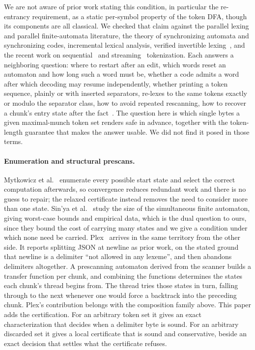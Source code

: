 \documentclass[11pt,a4paper]{article}
\theoremstyle{definition}
\theoremstyle{plain}
\begin{document}
We are not aware of prior work stating this condition, in particular the re-entrancy requirement, as a static per-symbol
property of the token DFA, though its components are all classical. We checked that claim against the parallel lexing
and parallel finite-automata literature, the theory of synchronizing automata and synchronizing codes, incremental
lexical analysis, verified invertible lexing~\cite{chassot2026ziplex}, and the recent work on
sequential~\cite{reps1998maximal,li2025uniform} and streaming~\cite{li2026streaming} tokenization. Each answers a
neighboring question: where to restart after an edit, which words reset an automaton and how long such a word must be,
whether a code admits a word after which decoding may resume independently, whether printing a token sequence, plainly
or with inserted separators, re-lexes to the same tokens exactly or modulo the separator class, how to avoid repeated
rescanning, how to recover a chunk's entry state after the fact~\cite{voetter2021gpu}. The question here is which single
bytes a given maximal-munch token set renders safe in advance, together with the token-length guarantee that makes the
answer usable. We did not find it posed in those terms.

\paragraph{Enumeration and structural prescans.} Mytkowicz et al.~\cite{mytkowicz2014dpfsm} enumerate every possible
start state and select the correct computation afterwards, so convergence reduces redundant work and there is no guess
to repair; the relaxed certificate instead removes the need to consider more than one state. Sin'ya et
al.~\cite{sinya2013sfa} study the size of the simultaneous finite automaton, giving worst-case bounds and empirical
data, which is the dual question to ours, since they bound the cost of carrying many states and we give a condition
under which none need be carried. Plex~\cite{li2021plex} arrives in the same territory from the other side. It reports
splitting JSON at newline as prior work, on the stated ground that newline is a delimiter ``not allowed in any lexeme'',
and then abandons delimiters altogether. A prescanning automaton derived from the scanner builds a transfer function per
chunk, and combining the functions determines the states each chunk's thread begins from. The thread tries those states
in turn, falling through to the next whenever one would force a backtrack into the preceding chunk. Plex's contribution
belongs with the composition family above. This paper adds the certification. For an arbitrary token set it gives an
exact characterization that decides when a delimiter byte is sound. For an arbitrary discarded set it gives a local
certificate that is sound and conservative, beside an exact decision that settles what the certificate refuses.
\end{document}
